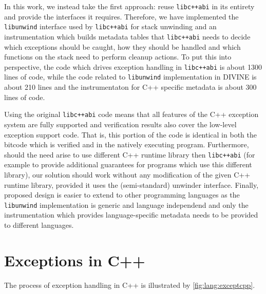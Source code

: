 In this work, we instead take the first approach: reuse
\texttt{libc++abi} in its entirety and provide the interfaces it
requires. Therefore, we have implemented the \texttt{libunwind}
interface used by \texttt{libc++abi} for stack unwinding and an \llvm{}
instrumentation which builds metadata tables that \texttt{libc++abi}
needs to decide which exceptions should be caught, how they should be
handled and which functions on the stack need to perform cleanup
actions.
To put this into perspective, the code which drives exception handling in \texttt{libc++abi} is about 1300 lines of code, while the code related to \texttt{libunwind} implementation in DIVINE is about 210 lines and the instrumentaton for C++ specific metadata is about 300 lines of code.

Using the original \texttt{libc++abi} code means that all features of
the C++ exception system are fully supported and verification results
also cover the low-level exception support code. That is, this portion
of the code is identical in both the bitcode which is verified and in
the natively executing program.
Furthermore, should the need arise to use different C++ runtime library then
\texttt{libc++abi} (for example to provide additional guarantees for programs
which use this different library), our solution should work without any
modification of the given C++ runtime library, provided it uses the
(semi-standard) unwinder interface.
Finally, proposed design is easier to extend to other programming
languages as the \texttt{libunwind} implementation is generic and language
independend and only the instrumentation which provides language-specific
metadata needs to be provided to different languages.

\section{Exceptions in C++}\label{sec:exceptions}

The process of exception handling in C++ is illustrated by \autoref{fig:lang:exceptcpp}.

